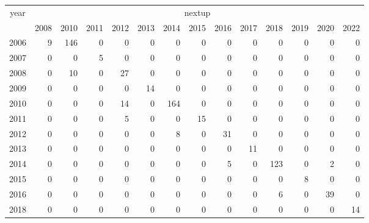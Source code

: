 \footnotesize\begin{tabular}[t]{lrrrrrrrrrrrrr}
\toprule
\multicolumn{1}{c}{year} & \multicolumn{13}{c}{nextup} \\
\cmidrule(l{3pt}r{3pt}){1-1} \cmidrule(l{3pt}r{3pt}){2-14}
  & 2008 & 2010 & 2011 & 2012 & 2013 & 2014 & 2015 & 2016 & 2017 & 2018 & 2019 & 2020 & 2022\\
\midrule
2006 & 9 & 146 & 0 & 0 & 0 & 0 & 0 & 0 & 0 & 0 & 0 & 0 & 0\\
2007 & 0 & 0 & 5 & 0 & 0 & 0 & 0 & 0 & 0 & 0 & 0 & 0 & 0\\
2008 & 0 & 10 & 0 & 27 & 0 & 0 & 0 & 0 & 0 & 0 & 0 & 0 & 0\\
2009 & 0 & 0 & 0 & 0 & 14 & 0 & 0 & 0 & 0 & 0 & 0 & 0 & 0\\
2010 & 0 & 0 & 0 & 14 & 0 & 164 & 0 & 0 & 0 & 0 & 0 & 0 & 0\\
2011 & 0 & 0 & 0 & 5 & 0 & 0 & 15 & 0 & 0 & 0 & 0 & 0 & 0\\
2012 & 0 & 0 & 0 & 0 & 0 & 8 & 0 & 31 & 0 & 0 & 0 & 0 & 0\\
2013 & 0 & 0 & 0 & 0 & 0 & 0 & 0 & 0 & 11 & 0 & 0 & 0 & 0\\
2014 & 0 & 0 & 0 & 0 & 0 & 0 & 0 & 5 & 0 & 123 & 0 & 2 & 0\\
2015 & 0 & 0 & 0 & 0 & 0 & 0 & 0 & 0 & 0 & 0 & 8 & 0 & 0\\
2016 & 0 & 0 & 0 & 0 & 0 & 0 & 0 & 0 & 0 & 6 & 0 & 39 & 0\\
2018 & 0 & 0 & 0 & 0 & 0 & 0 & 0 & 0 & 0 & 0 & 0 & 0 & 14\\
\bottomrule
\end{tabular}
